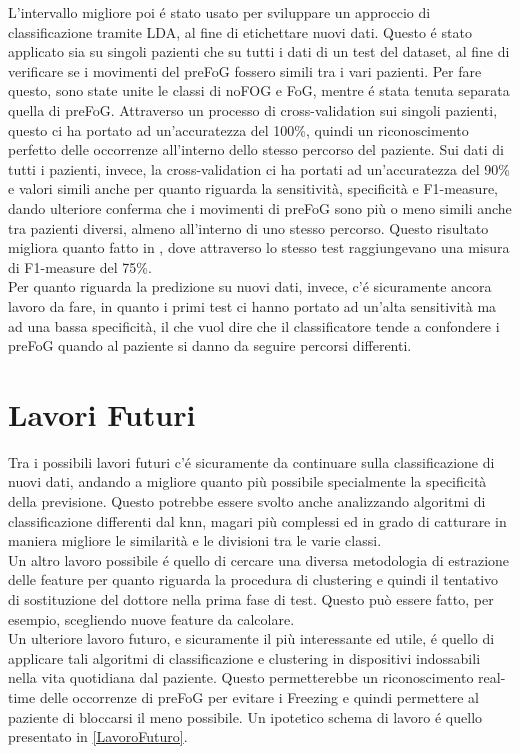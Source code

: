 L'intervallo migliore poi é stato usato per sviluppare un approccio di classificazione tramite LDA, al fine di etichettare nuovi dati. Questo é stato applicato sia su singoli pazienti che su tutti i dati di un test del dataset, al fine di verificare se i movimenti del preFoG fossero simili tra i vari pazienti. Per fare questo, sono state unite le classi di noFOG e FoG, mentre é stata tenuta separata quella di preFoG. Attraverso un processo di cross-validation sui singoli pazienti, questo ci ha portato ad un'accuratezza del 100\%, quindi un riconoscimento perfetto delle occorrenze all'interno dello stesso percorso del paziente. Sui dati di tutti i pazienti, invece, la cross-validation ci ha portati ad un'accuratezza del 90\% e valori simili anche per quanto riguarda la sensitività, specificità e F1-measure, dando ulteriore conferma che i movimenti di preFoG sono più o meno simili anche tra pazienti diversi, almeno all'interno di uno stesso percorso. Questo risultato migliora quanto fatto in \cite{12}, dove attraverso lo stesso test raggiungevano una misura di F1-measure del 75\%.\\
Per quanto riguarda la predizione su nuovi dati, invece, c'é sicuramente ancora lavoro da fare, in quanto i primi test ci hanno portato ad un'alta sensitività ma ad una bassa specificità, il che vuol dire che il classificatore tende a confondere i preFoG quando al paziente si danno da seguire percorsi differenti.
\section{Lavori Futuri}
Tra i possibili lavori futuri c'é sicuramente da continuare sulla classificazione di nuovi dati, andando a migliore quanto più possibile specialmente la specificità della previsione. Questo potrebbe essere svolto anche analizzando algoritmi di classificazione differenti dal knn, magari più complessi ed in grado di catturare in maniera migliore le similarità e le divisioni tra le varie classi.\\
Un altro lavoro possibile é quello di cercare una diversa metodologia di estrazione delle feature per quanto riguarda la procedura di clustering e quindi il tentativo di sostituzione del dottore nella prima fase di test. Questo può essere fatto, per esempio, scegliendo nuove feature da calcolare.\\
Un ulteriore lavoro futuro, e sicuramente il più interessante ed utile, é quello di applicare tali algoritmi di classificazione e clustering in dispositivi indossabili nella vita quotidiana dal paziente. Questo permetterebbe un riconoscimento real-time delle occorrenze di preFoG per evitare i Freezing e quindi permettere al paziente di bloccarsi il meno possibile. Un ipotetico schema di lavoro é quello presentato in \ref{LavoroFuturo}.

